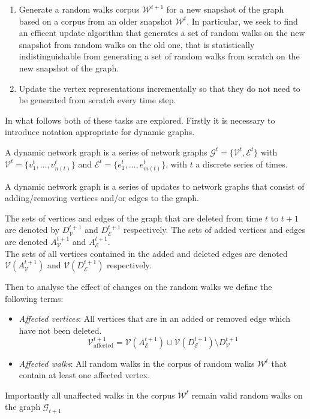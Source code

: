 \documentclass[a4paper]{article}
\renewcommand{\G}{\mathcal G}
\renewcommand{\V}{\mathcal V}
\newcommand{\W}{\mathcal W}
\begin{document}
\begin{enumerate}
\item Generate a random walks corpus $\W^{t+1}$ for a new snapshot of the graph based on
  a corpus from an older snapshot $\W^t$. In particular,
  we seek to find an efficent update algorithm that generates a set of random
  walks on the new snapshot from random walks on the old one, that is
  statistically indistinguishable from generating a set of random walks from
  scratch on the new snapshot of the graph.
  
\item  Update the vertex representations incrementally so that they do not need
  to be generated from scratch every time step.
  
\end{enumerate}
In what follows both of these tasks are explored. Firstly it is necessary to introduce notation appropriate for dynamic graphs.
\begin{definition}
A dynamic network graph is a series of network graphs $\G^t = \{\V^t,
  \mathcal{E}^t\}$ with $\V^t = \{v_1^t, \dots, v_{n(t)}^t\}$ and $\mathcal{E}^t = \{e_1^t, \dots,
  e_{m(t)}^t\}$, with $t$ a discrete series of times.
\end{definition}
A dynamic network graph is a series of updates to network graphs that consist of
adding/removing vertices and/or edges to the graph.
\begin{definition}
  The sets of vertices and edges of the graph that are deleted from time $t$
  to $t+1$ are denoted by $D_{\V}^{t+1}$ and $D_{\mathcal{E}}^{t+1}$ respectively. The
  sets of added vertices and edges are denoted $A_{\V}^{t+1}$ and
  $A_{\mathcal{E}}^{t+1}$.\\
  The sets of all vertices contained in the added and deleted edges are denoted
  $\V(A_{\V}^{t+1})$ and $\V(D_{\mathcal{E}}^{t+1})$ respectively.
\end{definition}
Then to analyse the effect of changes on the random walks we define the
following terms:
\begin{itemize}
  \item \textit{Affected vertices}: All vertices that are in an added or removed
    edge which have not been deleted.
    \[\V_{\text{affected}}^{t+1} = \V(A_{\mathcal{E}}^{t+1}) \cup
      \V(D_{\mathcal{E}}^{t+1}) \setminus D_{\V}^{t+1}\]
    \item \textit{Affected walks}: All random walks in the corpus of random walks
      $\W^t$ that contain at least one affected vertex.
    \end{itemize}
Importantly all unaffected walks in the corpus $\W^t$ remain valid random walks
on the graph $\G_{t+1}$
\end{document}
